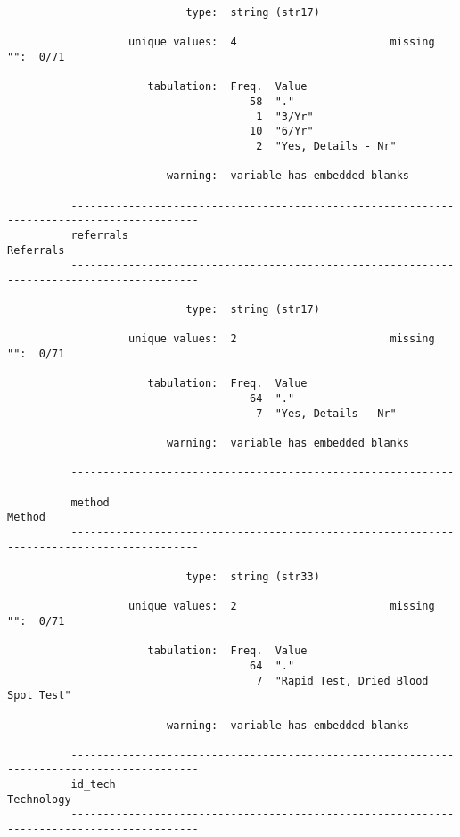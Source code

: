 \documentclass{article}
\begin{document}
\begin{verbatim}
                            type:  string (str17)
          
                   unique values:  4                        missing "":  0/71
          
                      tabulation:  Freq.  Value
                                      58  "."
                                       1  "3/Yr"
                                      10  "6/Yr"
                                       2  "Yes, Details - Nr"
          
                         warning:  variable has embedded blanks
          
          ------------------------------------------------------------------------------------------
          referrals                                                                        Referrals
          ------------------------------------------------------------------------------------------
          
                            type:  string (str17)
          
                   unique values:  2                        missing "":  0/71
          
                      tabulation:  Freq.  Value
                                      64  "."
                                       7  "Yes, Details - Nr"
          
                         warning:  variable has embedded blanks
          
          ------------------------------------------------------------------------------------------
          method                                                                              Method
          ------------------------------------------------------------------------------------------
          
                            type:  string (str33)
          
                   unique values:  2                        missing "":  0/71
          
                      tabulation:  Freq.  Value
                                      64  "."
                                       7  "Rapid Test, Dried Blood Spot Test"
          
                         warning:  variable has embedded blanks
          
          ------------------------------------------------------------------------------------------
          id_tech                                                                         Technology
          ------------------------------------------------------------------------------------------
          

\end{verbatim}
\end{document}
